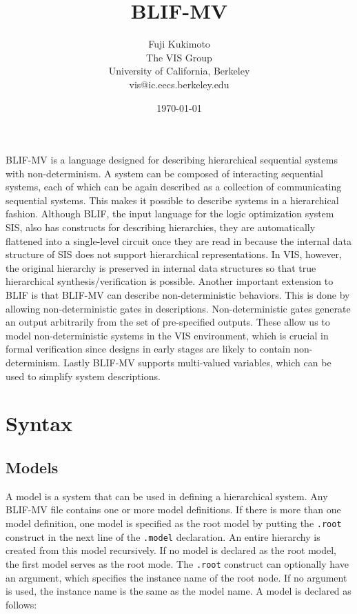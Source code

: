 \title{BLIF-MV}
\author{Fuji Kukimoto \vspace*{3mm} \\ The VIS Group\\
University of California, Berkeley\\
vis@ic.eecs.berkeley.edu
}
\date{\today}

\maketitle

BLIF-MV is a language designed for
describing hierarchical sequential systems with non-determinism.
A system can be composed of
interacting sequential systems, each of which
can be again described as a collection of communicating
sequential systems.
This makes it possible to describe
systems in a hierarchical fashion.
Although
BLIF, the input language for the logic optimization system SIS,
also has constructs for describing hierarchies,
they are automatically flattened into a single-level circuit
once they are read in
because the internal data structure of SIS does not support
hierarchical representations.
In VIS, however,
the original hierarchy is preserved
in internal data structures so that true hierarchical synthesis/verification
is possible.
Another important extension to BLIF
is that BLIF-MV can describe non-deterministic behaviors.
This is done by allowing non-deterministic gates in descriptions.
Non-deterministic gates
generate an output arbitrarily from the set of pre-specified outputs.
These allow us to model non-deterministic systems
in the VIS environment,
which is crucial in formal verification since designs in early stages
are likely to contain non-determinism.
Lastly
BLIF-MV supports
multi-valued variables, which can be used to simplify system descriptions.

\section{Syntax}
\subsection{Models}
A model is a system that can be used
in defining a hierarchical system.
Any BLIF-MV file contains one or more model definitions.
If there is more than one model definition,
one model is specified as the root model by putting the {\tt .root} construct
in the next line of the {\tt .model} declaration.
An entire hierarchy is created from this model recursively.
If no model is declared as the root model,
the first model serves as the root mode.
The {\tt .root} construct can optionally have an argument, which specifies
the instance name of the root node.
If no argument is used, the instance name is the same as the model name.
A model is declared as follows:

